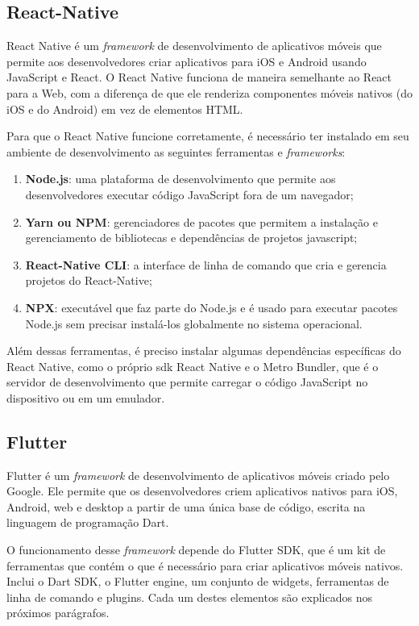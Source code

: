 \documentclass[12pt]{article}
\begin{document}
\subsection{React-Native} \label{sec:R-N}

React Native é um \textit{framework} de desenvolvimento de aplicativos móveis que permite aos desenvolvedores criar aplicativos para iOS e Android usando JavaScript e React. O React Native funciona de maneira semelhante ao React para a Web, com a diferença de que ele renderiza componentes móveis nativos (do iOS e do Android) em vez de elementos HTML. 

Para que o React Native funcione corretamente, é necessário ter instalado em seu ambiente de desenvolvimento as seguintes ferramentas e \textit{frameworks}: 

\begin{enumerate}
    \item \textbf{Node.js}: uma plataforma de desenvolvimento que permite aos desenvolvedores executar código JavaScript fora de um navegador; 
    \item \textbf{Yarn ou NPM}: gerenciadores de pacotes que permitem a instalação e gerenciamento de bibliotecas e dependências de projetos javascript; 
    \item \textbf{React-Native CLI}: a interface de linha de comando que cria e gerencia projetos do React-Native;
    \item \textbf{NPX}: executável que faz parte do Node.js e é usado para executar pacotes Node.js sem precisar instalá-los globalmente no sistema operacional. 
\end{enumerate}

Além dessas ferramentas, é preciso instalar algumas dependências específicas do React Native, como o próprio sdk React Native e o Metro Bundler, que é o servidor de desenvolvimento que permite carregar o código JavaScript no dispositivo ou em um emulador.


\subsection{Flutter} \label{sec:Flutter}

Flutter é um \textit{framework} de desenvolvimento de aplicativos móveis criado pelo Google. Ele permite que os desenvolvedores criem aplicativos nativos para iOS, Android, web e desktop a partir de uma única base de código, escrita na linguagem de programação Dart. 

O funcionamento desse \textit{framework} depende do Flutter SDK, que é um kit de ferramentas que contém o que é necessário para criar aplicativos móveis nativos. Inclui o Dart SDK, o Flutter engine, um conjunto de widgets, ferramentas de linha de comando e plugins. Cada um destes elementos são explicados nos próximos parágrafos.
\end{document}
